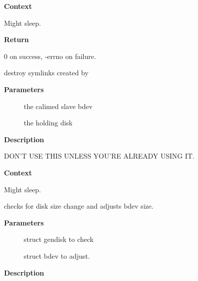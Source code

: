 \documentclass[a4paper,8pt,english]{sphinxmanual}
\begin{document}
\textbf{Context}

Might sleep.

\textbf{Return}

0 on success, -errno on failure.

\begin{fulllineitems}
\label{filesystems/index:c.bd_unlink_disk_holder}
destroy symlinks created by {\hyperref[filesystems/index:c.bd_link_disk_holder]{\emph{}}}

\end{fulllineitems}


\textbf{Parameters}
\begin{description}
\item[{}] \leavevmode
the calimed slave bdev

\item[{}] \leavevmode
the holding disk

\end{description}

\textbf{Description}

DON'T USE THIS UNLESS YOU'RE ALREADY USING IT.

\textbf{Context}

Might sleep.

\begin{fulllineitems}
\label{filesystems/index:c.check_disk_size_change}
checks for disk size change and adjusts bdev size.

\end{fulllineitems}


\textbf{Parameters}
\begin{description}
\item[{}] \leavevmode
struct gendisk to check

\item[{}] \leavevmode
struct bdev to adjust.

\end{description}

\textbf{Description}
\end{document}
